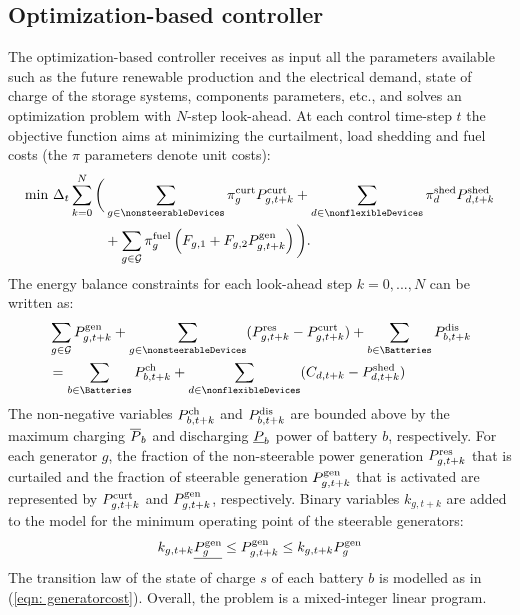 \documentclass{article}
\begin{document}
\subsection{Optimization-based controller}\label{sec: optcontroller}
    The optimization-based controller receives as input all the parameters available such as the future renewable production and the electrical demand, state of charge of the storage systems, components parameters, etc., and solves an optimization problem with $N$-step look-ahead. At each control time-step $t$ the objective function aims at minimizing the curtailment, load shedding and fuel costs (the $\pi$ parameters denote unit costs):
    \begin{align}
    \min &\ \OPduration \sum_{k=0}^{N} \bigg(\sum_{g\in \nonsteerableDevices} \OPprice{curt}_g \curtail_{g, t+k} + \sum_{d \in \nonflexibleDevices} \OPprice{shed}_d \shed_{d, t+k} \notag \\
    & \quad \quad \quad \quad + \sum_{g \in \mathcal{G}}   \OPprice{fuel}_g \left(F_{g, 1} + F_{g, 2} \steer_{g, t+k}\right) \bigg).
    \end{align}
    The energy balance constraints for each look-ahead step $k=0,...,N$ can be written as:
    \begin{align}
    & \sum_{g \in \mathcal{G}} \steer_{g,t+k}
    + \sum_{g\in \nonsteerableDevices} (\nonSteerable_{g,t+k} - \curtail_{g,t+k}) \notag + \sum_{b\in\Batteries} \discharge_{b,t+k} \\
    & = \sum_{b\in\Batteries} \charge_{b,t+k} + \sum_{d \in \nonflexibleDevices}  (\nonFlexible_{d,t+k} -\shed_{d,t+k}) \label{eq:net_position} 
    \end{align}
    The non-negative variables $P^{\text{ch}}_{b,t+k}$ and $P^{\text{dis}}_{b,t+k}$ are bounded above by the maximum charging $\overline{P}_b$ and discharging $\underline{P}_b$ power of battery $b$, respectively. 
    For each generator $g$, the fraction of the non-steerable power generation $P^\text{res}_{g,t+k}$ that is curtailed and the fraction of steerable generation $P^\text{gen}_{g,t+k}$ that is activated are represented by $P^\text{curt}_{g,t+k}$ and $P^\text{gen}_{g,t+k}$, respectively. Binary variables $k_{g,t+k}$ are added to the model for the minimum operating point of the steerable generators:
    \begin{equation}
    k_{g,t+k} \underline{P^\text{gen}_{g}} \leq P^\text{gen}_{g,t+k} \leq  k_{g,t+k} P^\text{gen}_{g}
    \end{equation}
    The transition law of the state of charge $s$ of each battery $b$ is modelled as in (\ref{eqn: generatorcost}).
    Overall, the problem is a mixed-integer linear program.
\end{document}
